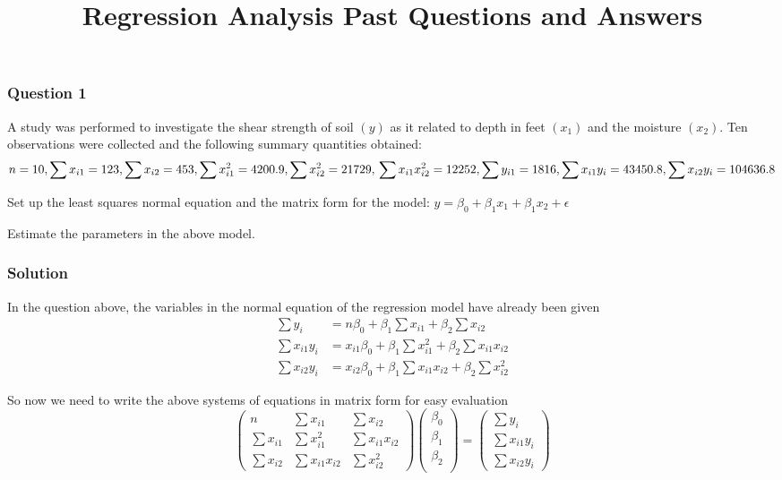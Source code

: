 \documentclass[
]{article}
\title{Regression Analysis Past Questions and Answers}
\author{}
\date{\vspace{-2.5em}}
\begin{document}
\maketitle

{
\setcounter{tocdepth}{2}
\tableofcontents
}
\subsubsection{Question 1}\label{question-1}

A study was performed to investigate the shear strength of soil \((y)\)
as it related to depth in feet \((x_1)\) and the moisture \((x_2)\). Ten
observations were collected and the following summary quantities
obtained: \begin{equation*}
     n=10, \sum x_{i1} = 123, \sum x_{i2} = 453, \sum x^2_{i1} = 4200.9, 
     \sum x^2_{i2} = 21729,  \newline
     \sum x_{i1}x^2_{i2} = 12252, \sum y_{i1} = 1816,
     \sum x_{i1}y_i = 43450.8, \sum x_{i2}y_i = 104636.8
     \end {equation*}

Set up the least squares normal equation and the matrix form for the
model: \(y = \beta_0 + \beta_1 x_1 + \beta_1 x_2 + \epsilon\)

Estimate the parameters in the above model.

\subsubsection{Solution}\label{solution}

In the question above, the variables in the normal equation of the
regression model have already been given \begin{align*}
    \sum y_i & = n\beta_0 +\beta_1\sum x_{i1} + \beta_2\sum x_{i2} \\
    \sum x_{i1}y_i & = x_{i1}\beta_0 +\beta_1\sum x_{i1}^2 + \beta_2\sum x_{i1}x_{i2} \\
    \sum x_{i2}y_i & = x_{i2}\beta_0 +\beta_1\sum x_{i1}x_{i2} + \beta_2\sum x_{i2}^2
  \end{align*}

So now we need to write the above systems of equations in matrix form
for easy evaluation \begin{equation*}
    \begin{pmatrix}
    n & \sum x_{i1} & \sum x_{i2} \\
    \sum x_{i1} & \sum x_{i1}^2 & \sum x_{i1}x_{i2}\\
    \sum x_{i2} & \sum x_{i1}x_{i2} & \sum x_{i2}^2
    \end{pmatrix}
    \begin{pmatrix}
      \beta_0\\
      \beta_1\\
      \beta_2\\
    \end{pmatrix}
    =
    \begin{pmatrix}
      \sum y_i \\
      \sum x_{i1}y_i \\
      \sum x_{i2}y_i
    \end{pmatrix}
\end{equation*}
\end{document}
